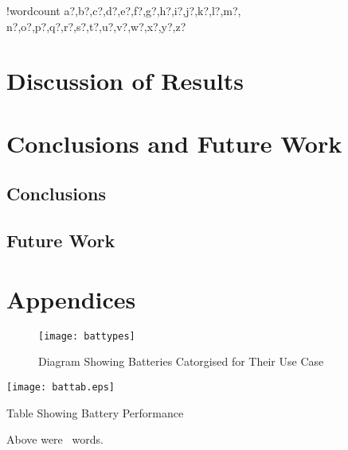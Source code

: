 \documentclass[fontsize=9.5pt]{extarticle}
\newcounter{words}
\newenvironment{counted}{%
  \setcounter{words}{0}
  \SearchList!{wordcount}{\stepcounter{words}}
    {a?,b?,c?,d?,e?,f?,g?,h?,i?,j?,k?,l?,m?,
    n?,o?,p?,q?,r?,s?,t?,u?,v?,w?,x?,y?,z?}
  \UndoBoundary{'}
  \SearchOrder{p;}}{%
  \StopSearching}
\begin{document}
\begin{counted}
\section{Discussion of Results}\label{discussion-of-results}

\section{Conclusions and Future Work}\label{conclusions-and-future-work}

\subsection{Conclusions}\label{conclusions}

\subsection{Future Work}\label{future-work}

\newpage

\section{Appendices}

\begin{figure}[H]
\centering
\texttt{[image: battypes]}
\caption{Diagram Showing Batteries Catorgised for Their Use Case \cite{Dunn928}}
\label{battypes}
\end{figure}

\begin{landscape}

\begin{table}[H]
\centering
\texttt{[image: battab.eps]}
\caption{Table Showing Battery Performance}
\label{battabs}
\end{table}

\end{landscape}

\end{counted} %

Above were \thewords\ words. %
\newpage

% 

\printbibliography
\end{document}
